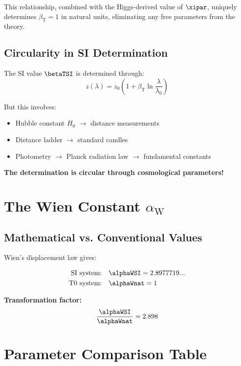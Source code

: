 	This relationship, combined with the Higgs-derived value of $\xipar$, uniquely determines $\beta_{\text{T}} = 1$ in natural units, eliminating any free parameters from the theory.
	
	\subsection{Circularity in SI Determination}
	\label{subsec:beta_circularity}
	
	The SI value $\betaTSI$ is determined through:
	$$z(\lambda) = z_0\left(1 + \beta_{\text{T}} \ln\frac{\lambda}{\lambda_0}\right)$$
	
	But this involves:
	\begin{itemize}
		\item Hubble constant $H_0$ $\rightarrow$ distance measurements
		\item Distance ladder $\rightarrow$ standard candles
		\item Photometry $\rightarrow$ Planck radiation law $\rightarrow$ fundamental constants
	\end{itemize}
	
	\textbf{The determination is circular through cosmological parameters!}
	
	\section{The Wien Constant $\alpha_{\text{W}}$}
	\label{sec:alpha_w}
	
	\subsection{Mathematical vs. Conventional Values}
	\label{subsec:wien_values}
	
	Wien's displacement law gives:
	
	\begin{align}
		\text{SI system:} \quad &\alphaWSI = 2.8977719... \\
		\text{T0 system:} \quad &\alphaWnat = 1
	\end{align}
	
	\textbf{Transformation factor:}
	$$\frac{\alphaWSI}{\alphaWnat} = 2.898$$
	
	\section{Parameter Comparison Table}
	\label{sec:parameter_comparison}
	
